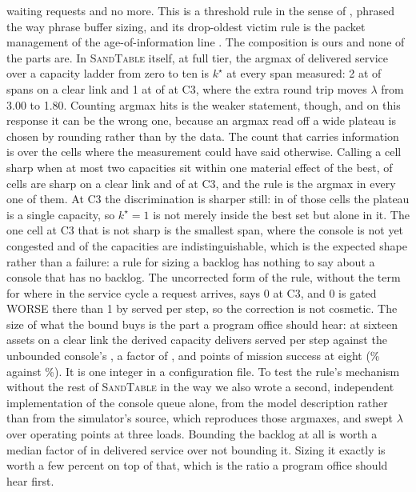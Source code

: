 \documentclass[11pt]{article}
\newcommand{\sandtable}{\textsc{SandTable}}
\begin{document}
waiting requests and no more. This is a threshold rule in the sense of \citet{naor1969regulation}, phrased the way \citet{appenzeller2004sizing} phrase buffer sizing, and its drop-oldest victim rule is the packet management of the age-of-information line \citep{kaul2012real,costa2016age}. The composition is ours and none of the parts are. In \sandtable{} itself, at full tier, the argmax of delivered service over a capacity ladder from zero to ten is $k^{\star}$ at every span measured: 2 at \StQcapClearHit{} of \StQcapClearSpans{} spans on a clear link and 1 at \StQcapJamHit{} of \StQcapJamSpans{} at C3, where the extra round trip moves $\lambda$ from 3.00 to 1.80. Counting argmax hits is the weaker statement, though, and on this response it can be the wrong one, because an argmax read off a wide plateau is chosen by rounding rather than by the data. The count that carries information is over the cells where the measurement could have said otherwise. Calling a cell sharp when at most two capacities sit within one material effect of the best, \StQcapClearSharp{} of \StQcapClearSpans{} cells are sharp on a clear link and \StQcapJamSharp{} of \StQcapJamSpans{} at C3, and the rule is the argmax in every one of them. At C3 the discrimination is sharper still: in \StQcapJamSoleWidth{} of those cells the plateau is a single capacity, so $k^{\star} = 1$ is not merely inside the best set but alone in it. The one cell at C3 that is not sharp is the smallest span, where the console is not yet congested and \StQcapJamWidestPlateau{} of the capacities are indistinguishable, which is the expected shape rather than a failure: a rule for sizing a backlog has nothing to say about a console that has no backlog. The uncorrected form of the rule, without the term for where in the service cycle a request arrives, says 0 at C3, and 0 is gated WORSE there than 1 by \StQcapJamFloorGap{} served per step, so the correction is not cosmetic. The size of what the bound buys is the part a program office should hear: at sixteen assets on a clear link the derived capacity delivers \StQcapClearBest{} served per step against the unbounded console's \StQcapClearNone{}, a factor of \StQcapClearRatio{}, and \StQcapSuccGain{} points of mission success at eight (\StQcapSuccBound\% against \StQcapSuccNone\%). It is one integer in a configuration file. To test the rule's mechanism without the rest of \sandtable{} in the way we also wrote a second, independent implementation of the console queue alone, from the model description rather than from the simulator's source, which reproduces those argmaxes, and swept $\lambda$ over \QcapPoints{} operating points at three loads. Bounding the backlog at all is worth a median factor of \QcapUnboundedGainMed{} in delivered service over not bounding it. Sizing it exactly is worth a few percent on top of that, which is the ratio a program office should hear first.
\end{document}
